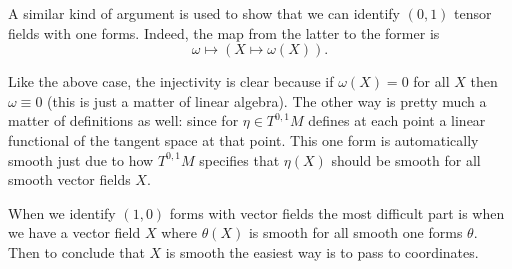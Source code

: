 \begin{remark}
    A similar kind of argument is used to show that we can identify $(0, 1)$ tensor fields with one forms. Indeed, the map from the latter to the former is
    \[\omega \mapsto (X \mapsto \omega(X)).\]

    Like the above case, the injectivity is clear because if $\omega(X) = 0$ for all $X$ then $\omega \equiv 0$ (this is just a matter of linear algebra). The other way is pretty much a matter of definitions as well: since for $\eta \in T^{0,1}M$ defines at each point a linear functional of the tangent space at that point. This one form is automatically smooth just due to how $T^{0,1}M$ specifies that $\eta(X)$ should be smooth for all smooth vector fields $X$.

    When we identify $(1, 0)$ forms with vector fields the most difficult part is when we have a vector field $X$ where $\theta(X)$ is smooth for all smooth one forms $\theta$. Then to conclude that $X$ is smooth the easiest way is to pass to coordinates.
\end{remark}

\printbibliography


